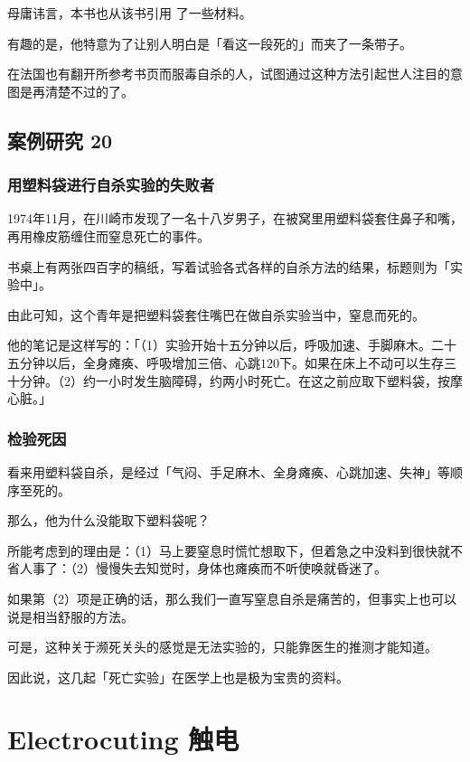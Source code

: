 \documentclass[UTF8]{ctexart}
\begin{document}
母庸讳言，本书也从该书引用 了一些材料。 

有趣的是，他特意为了让别人明白是「看这一段死的」而夹了一条带子。

在法国也有翻开所参考书页而服毒自杀的人，试图通过这种方法引起世人注目的意图是再清楚不过的了。

\subsection{案例研究 20}

\subsubsection*{用塑料袋进行自杀实验的失败者}

1974年11月，在川崎市发现了一名十八岁男子，在被窝里用塑料袋套住鼻子和嘴，再用橡皮筋缠住而窒息死亡的事件。

书桌上有两张四百字的稿纸，写着试验各式各样的自杀方法的结果，标题则为「实验中」。

由此可知，这个青年是把塑料袋套住嘴巴在做自杀实验当中，窒息而死的。

他的笔记是这样写的：「（1）实验开始十五分钟以后，呼吸加速、手脚麻木。二十五分钟以后，全身瘫痪、呼吸增加三倍、心跳$120$下。如果在床上不动可以生存三十分钟。（2）约一小时发生脑障碍，约两小时死亡。在这之前应取下塑料袋，按摩心脏。」

\subsubsection*{检验死因}

看来用塑料袋自杀，是经过「气闷、手足麻木、全身瘫痪、心跳加速、失神」等顺序至死的。

那么，他为什么没能取下塑料袋呢？

所能考虑到的理由是：（1）马上要窒息时慌忙想取下，但着急之中没料到很快就不省人事了：（2）慢慢失去知觉时，身体也瘫痪而不听使唤就昏迷了。

如果第（2）项是正确的话，那么我们一直写窒息自杀是痛苦的，但事实上也可以说是相当舒服的方法。

可是，这种关于濒死关头的感觉是无法实验的，只能靠医生的推测才能知道。 

因此说，这几起「死亡实验」在医学上也是极为宝贵的资料。

\newpage

\section{Electrocuting 触电}
\end{document}
